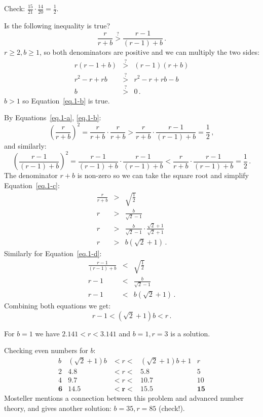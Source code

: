 Check: $\frac{15}{21}\cdot\frac{14}{20}=\frac{1}{2}$.


Is the following inequality is true?
\begin{equation}\label{eq.1-b}
\frac{r}{r+b} \stackrel{?}{>} \frac{r-1}{(r-1)+b}\,.
\end{equation}
$r\geq 2, b\geq 1$, so both denominators are positive and we can multiply the two sides:
\begin{eqnarray*}
r(r-1+b)&\stackrel{?}{>}&(r-1)(r+b)\\
r^2-r+rb&\stackrel{?}{>}&r^2-r+rb-b\\
b&\stackrel{?}{>}&0\,.
\end{eqnarray*}
$b>1$ so Equation~\ref{eq.1-b} is true.

By Equations~\ref{eq.1-a}, \ref{eq.1-b}:
\begin{equation}\label{eq.1-c}
\left(\frac{r}{r+b}\right)^2 = \frac{r}{r+b} \cdot\frac{r}{r+b} > \frac{r}{r+b} \cdot \frac{r-1}{(r-1)+b} = \frac{1}{2}\,,
\end{equation}
and similarly:
\begin{equation}\label{eq.1-d}
\left(\frac{r-1}{(r-1)+b}\right)^2  = \frac{r-1}{(r-1)+b}\cdot \frac{r-1}{(r-1)+b}<  \frac{r}{r+b} \cdot \frac{r-1}{(r-1)+b} = \frac{1}{2}\,.
\end{equation}
The denominator $r+b$ is non-zero so we can take the square root and simplify Equation~\ref{eq.1-c}:
\begin{eqnarray*}
\frac{r}{r+b}  &>& \sqrt{\frac{1}{2}}\\
r&>&\frac{b}{\sqrt{2}-1}\\
r&>&\frac{b}{\sqrt{2}-1}\cdot\frac{\sqrt{2}+1}{\sqrt{2}+1}\\
r&>&b(\sqrt{2}+1)\,.
\end{eqnarray*}
Similarly for Equation~\ref{eq.1-d}:
\begin{eqnarray*}
\frac{r-1}{(r-1)+b}&<&\sqrt{\frac{1}{2}}\\
r-1 &<& \frac{b}{\sqrt{2}-1}\\
r-1&<&b(\sqrt{2}+1)\,.
\end{eqnarray*}
Combining both equations we get:
\[
r-1<(\sqrt{2}+1)b<r\,.
\]

For $b=1$ we have $2.141 < r< 3.141$ and $b=1,r=3$ is a solution.

 Checking even numbers for $b$:
\begin{displaymath}	
\renewcommand{\arraystretch}{1}
\begin{array}{r|ccc|c}
b& (\sqrt{2}+1)b&<r<& (\sqrt{2}+1)b+1&r\\
\hline
2&4.8&<r<&5.8&5\\
4&9.7&<r<&10.7&10\\
\mathbf{6}&\mathbf{14.5}&\mathbf{<r<}&\mathbf{15.5}&\mathbf{15}
\end{array}
\end{displaymath}
Mosteller mentions a connection between this problem and advanced number theory, and gives another solution: $b=35,r=85$ (check!).

